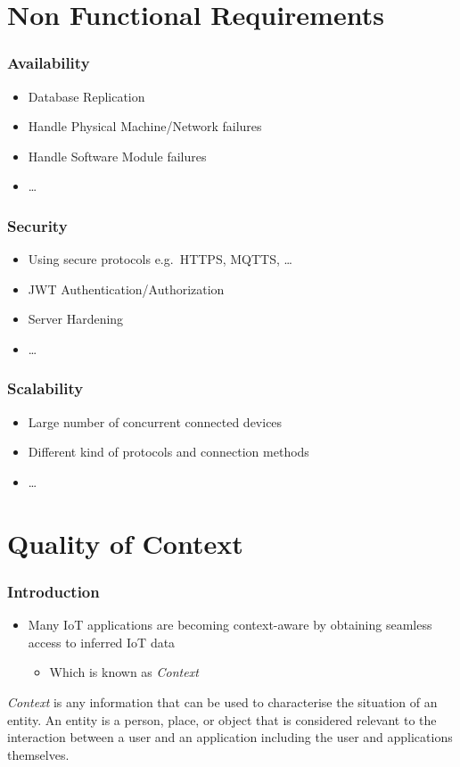 \documentclass{../iot-lecture}
\begin{document}
\section{Non Functional Requirements}

\begin{frame}
  \frametitle{Availability}
  \begin{itemize}
    \item Database Replication
    \item Handle Physical Machine/Network failures
    \item Handle Software Module failures
    \item \ldots
  \end{itemize}
\end{frame}

\begin{frame}
  \frametitle{Security}
  \begin{itemize}
    \item Using secure protocols e.g.\ HTTPS, MQTTS, \ldots
    \item JWT Authentication/Authorization
    \item Server Hardening
    \item \ldots
  \end{itemize}
\end{frame}

\begin{frame}
  \frametitle{Scalability}
  \begin{itemize}
    \item Large number of concurrent connected devices
    \item Different kind of protocols and connection methods
    \item \ldots
  \end{itemize}
\end{frame}

\section{Quality of Context}

\begin{frame}
  \frametitle{Introduction }
  \begin{itemize}
    \item Many IoT applications are becoming context-aware by obtaining seamless access to inferred IoT data
    \begin{itemize}
      \item Which is known as \textit{Context}
    \end{itemize}
  \end{itemize}
  \begin{block}{}
    \textit{Context} is any information that can be used to characterise the situation of an entity.
    An entity is a person, place, or object that is considered relevant to the interaction between a user and an application
    including the user and applications themselves.
  \end{block}
\end{frame}
\end{document}
